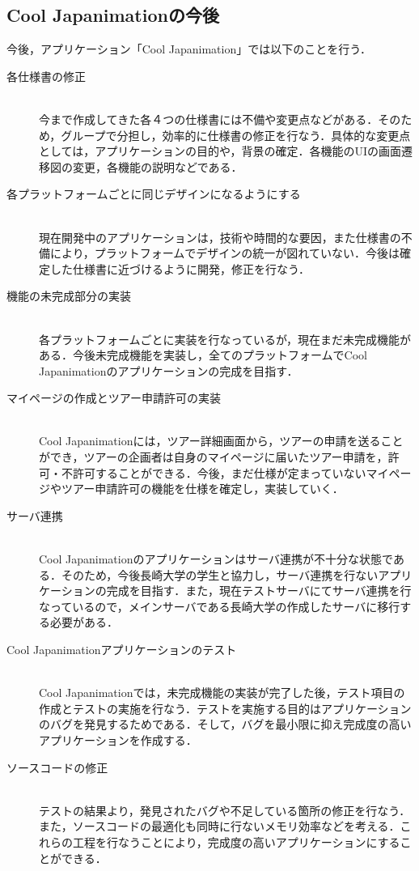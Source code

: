 \subsection{Cool Japanimationの今後}
\par
今後，アプリケーション「Cool Japanimation」では以下のことを行う．
\begin{description}
\item[各仕様書の修正]\mbox{}\\
今まで作成してきた各４つの仕様書には不備や変更点などがある．そのため，グループで分担し，効率的に仕様書の修正を行なう．具体的な変更点としては，アプリケーションの目的や，背景の確定．各機能のUIの画面遷移図の変更，各機能の説明などである．
\item[各プラットフォームごとに同じデザインになるようにする]\mbox{}\\
現在開発中のアプリケーションは，技術や時間的な要因，また仕様書の不備により，プラットフォームでデザインの統一が図れていない．今後は確定した仕様書に近づけるように開発，修正を行なう．
\item[機能の未完成部分の実装]\mbox{}\\
各プラットフォームごとに実装を行なっているが，現在まだ未完成機能がある．今後未完成機能を実装し，全てのプラットフォームでCool Japanimationのアプリケーションの完成を目指す．
\item[マイページの作成とツアー申請許可の実装]\mbox{}\\
Cool Japanimationには，ツアー詳細画面から，ツアーの申請を送ることができ，ツアーの企画者は自身のマイページに届いたツアー申請を，許可・不許可することができる．今後，まだ仕様が定まっていないマイページやツアー申請許可の機能を仕様を確定し，実装していく．
\item[サーバ連携]\mbox{}\\
Cool Japanimationのアプリケーションはサーバ連携が不十分な状態である．そのため，今後長崎大学の学生と協力し，サーバ連携を行ないアプリケーションの完成を目指す．また，現在テストサーバにてサーバ連携を行なっているので，メインサーバである長崎大学の作成したサーバに移行する必要がある．
\item[Cool Japanimationアプリケーションのテスト]\mbox{}\\
Cool Japanimationでは，未完成機能の実装が完了した後，テスト項目の作成とテストの実施を行なう．テストを実施する目的はアプリケーションのバグを発見するためである．そして，バグを最小限に抑え完成度の高いアプリケーションを作成する．
\item[ソースコードの修正]\mbox{}\\
テストの結果より，発見されたバグや不足している箇所の修正を行なう．また，ソースコードの最適化も同時に行ないメモリ効率などを考える．これらの工程を行なうことにより，完成度の高いアプリケーションにすることができる．

\end{description}
